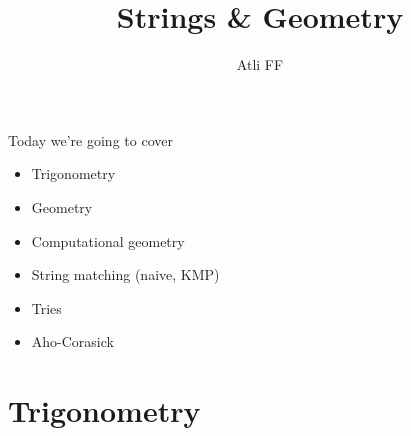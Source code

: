 \documentclass{beamer}
\title{Strings \& Geometry}
\author{Atli FF}
\institute{\href{http://ru.is/td}{School of Computer Science} \\[2pt] \href{http://ru.is}{Reykjavík University}}
\begin{document}
\maketitle

\begin{frame}[plain]{Today we're going to cover}
    \begin{itemize}
    		\item Trigonometry
    		\item Geometry
    		\item Computational geometry
        \item String matching (naive, KMP)
        \item Tries
        \item Aho-Corasick
    \end{itemize}
\end{frame}

\section*{Trigonometry}
\end{document}
